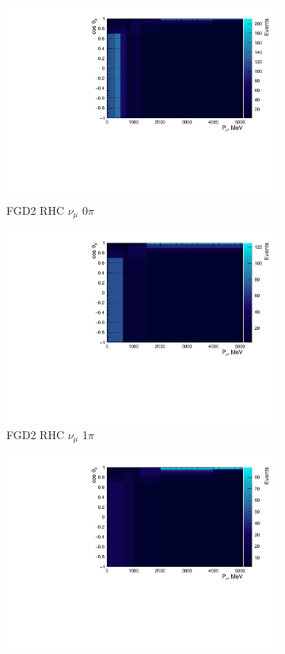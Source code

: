 \begin{figure}
\begin{subfigure}{.32\textwidth}
  \includegraphics[width=0.95\linewidth]{figs/NomMC_MC_FGD2_NuMuBkg_CC0pi_in_AntiNu_Mode}
  \caption{FGD2 RHC $\nu_{\mu}$ 0$\pi$}
  \label{fig:2d_FGD2_NuMuBkg_CC0pi_in_AntiNu_Mode}
\end{subfigure}
\begin{subfigure}{.32\textwidth}
  \centering
  \includegraphics[width=0.95\linewidth]{figs/NomMC_MC_FGD2_NuMuBkg_CC1pi_in_AntiNu_Mode}
  \caption{FGD2 RHC $\nu_{\mu}$ 1$\pi$}
  \label{fig:2d_FGD2_NuMuBkg_CC1pi_in_AntiNu_Mode}
\end{subfigure}
\begin{subfigure}{.32\textwidth}
  \centering
  \includegraphics[width=0.95\linewidth]{figs/NomMC_MC_FGD2_NuMuBkg_CCOther_in_AntiNu_Mode}

\end{subfigure}
\end{figure}
